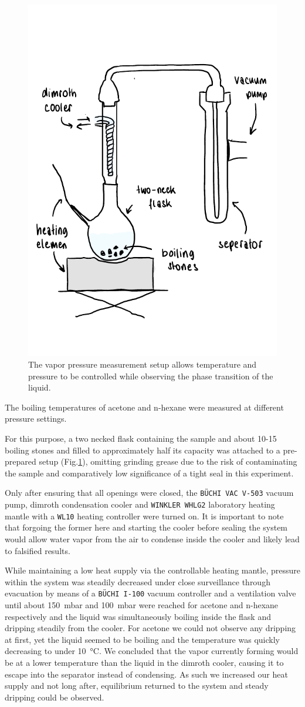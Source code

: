 \begin{figure}[H]
    \centering
    \includegraphics[width=.5\textwidth]{figures/ddr_sketch_setup.pdf}
    \caption{The vapor pressure measurement setup allows temperature and pressure to be controlled while observing the phase transition of the liquid.}
    \label{fig:sketch_setup}
\end{figure}

The boiling temperatures of acetone and n-hexane were measured at different pressure settings. 

For this purpose, a two necked flask containing the sample and about 10-15 boiling stones and filled to approximately half its capacity was attached to a pre-prepared setup (Fig.\ref{fig:sketch_setup}), omitting grinding grease due to the risk of contaminating the sample and comparatively low significance of a tight seal in this experiment.

Only after ensuring that all openings were closed, the \texttt{BÜCHI VAC V-503} vacuum pump, dimroth condensation cooler and \texttt{WINKLER WHLG2} laboratory heating mantle with a \texttt{WL10} heating controller were turned on. It is important to note that forgoing the former here and starting the cooler before sealing the system would allow water vapor from the air to condense inside the cooler and likely lead to falsified results. 

While maintaining a low heat supply via the controllable heating mantle, pressure within the system was steadily decreased under close surveillance through evacuation by means of a \texttt{BÜCHI I-100} vacuum controller and a ventilation valve until about \qty{150}{\milli\bar} and \qty{100}{\milli\bar} were reached for acetone and n-hexane respectively and the liquid was simultaneously boiling inside the flask and dripping steadily from the cooler. For acetone we could not observe any dripping at first, yet the liquid seemed to be boiling and the temperature was quickly decreasing to under \qty{10}{\celsius}. We concluded that the vapor currently forming would be at a lower temperature than the liquid in the dimroth cooler, causing it to escape into the separator instead of condensing. As such we increased our heat supply and not long after, equilibrium returned to the system and steady dripping could be observed. 

